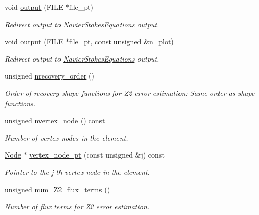 \begin{DoxyCompactItemize}
void \hyperlink{classoomph_1_1TTaylorHoodElement_af3f6c0194dd358936c610fc81e7ff215}{output} (F\+I\+LE $\ast$file\+\_\+pt)
\begin{DoxyCompactList}\small\item\em Redirect output to \hyperlink{classoomph_1_1NavierStokesEquations}{Navier\+Stokes\+Equations} output. \end{DoxyCompactList}\item 
void \hyperlink{classoomph_1_1TTaylorHoodElement_ab7aa0a74ee8fd566b95d3681f2240c62}{output} (F\+I\+LE $\ast$file\+\_\+pt, const unsigned \&n\+\_\+plot)
\begin{DoxyCompactList}\small\item\em Redirect output to \hyperlink{classoomph_1_1NavierStokesEquations}{Navier\+Stokes\+Equations} output. \end{DoxyCompactList}\item 
unsigned \hyperlink{classoomph_1_1TTaylorHoodElement_a132c8f850554a160cdc8d2afecb26b3a}{nrecovery\+\_\+order} ()
\begin{DoxyCompactList}\small\item\em Order of recovery shape functions for Z2 error estimation\+: Same order as shape functions. \end{DoxyCompactList}\item 
unsigned \hyperlink{classoomph_1_1TTaylorHoodElement_a88de8397e5afde8e3d5bb2639d1b91ff}{nvertex\+\_\+node} () const
\begin{DoxyCompactList}\small\item\em Number of vertex nodes in the element. \end{DoxyCompactList}\item 
\hyperlink{classoomph_1_1Node}{Node} $\ast$ \hyperlink{classoomph_1_1TTaylorHoodElement_a3275ab39f68ac0db35dc31bce6b0bdf5}{vertex\+\_\+node\+\_\+pt} (const unsigned \&j) const
\begin{DoxyCompactList}\small\item\em Pointer to the j-\/th vertex node in the element. \end{DoxyCompactList}\item 
unsigned \hyperlink{classoomph_1_1TTaylorHoodElement_a17f2b01ed0325674c23b272ce217e66a}{num\+\_\+\+Z2\+\_\+flux\+\_\+terms} ()
\begin{DoxyCompactList}\small\item\em Number of \textquotesingle{}flux\textquotesingle{} terms for Z2 error estimation. \end{DoxyCompactList}\item 

\end{DoxyCompactItemize}
